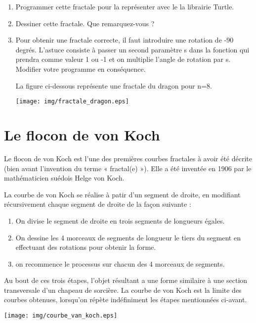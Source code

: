 \documentclass[11pt,a4paper]{article}
\begin{document}
\begin{enumerate}
\item Programmer cette fractale pour la représenter avec le la librairie Turtle.
\item Dessiner cette fractale. Que remarquez-vous ?
\item Pour obtenir une fractale correcte, il faut introduire une rotation de -90 degrés. L'astuce consiste à passer un second paramètre s dans la fonction qui prendra comme valeur 1 ou -1 et on multiplie l'angle de rotation par s. Modifier votre programme en conséquence.

La figure ci-dessous représente une fractale du dragon pour n=8.
\begin{center}
\texttt{[image: img/fractale\_dragon.eps]}
\end{center}
\end{enumerate}

\section{Le flocon de von Koch}

Le flocon de von Koch est l'une des premières courbes fractales à avoir été décrite (bien avant l'invention du terme « fractal(e) »). Elle a été inventée en 1906 par le mathématicien suédois Helge von Koch.

La courbe de von Koch se réalise à patir d'un segment de droite, en modifiant récursivement chaque segment de droite de la façon suivante :
\begin{enumerate}
\item On divise le segment de droite en trois segments de longueurs égales.
\item On dessine les 4 morceaux de segments de longueur le tiers du segment en effectuant des rotations pour obtenir la forme.
\item on recommence le processus sur chacun des 4 morceaux de segments.
\end{enumerate}\medskip

\begin{minipage}{12cm}
Au bout de ces trois étapes, l'objet résultant a une
forme similaire à une section transversale d'un chapeau de
sorcière. La courbe de von Koch est la limite des courbes
obtenues, lorsqu'on répète indéfiniment les étapes
mentionnées ci-avant.\medskip

\end{minipage}\hfill
\begin{minipage}{6cm}
\begin{center}
\texttt{[image: img/courbe\_van\_koch.eps]}
\end{center}
\end{minipage}
\end{document}
